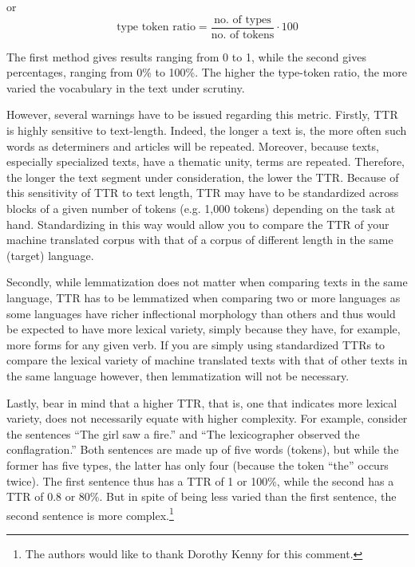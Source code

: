 \documentclass[output=paper]{langscibook}
\begin{document}
\noindent or
\begin{equation}
\text{type token ratio}=\frac{\text{no. of types}}{\text{no. of tokens}} \cdot 100
\end{equation}

The first method gives results ranging from 0 to 1, while the second gives percentages, ranging from 0\% to 100\%. The higher the type-token ratio, the more varied the vocabulary in the text under scrutiny.

However, several warnings have to be issued regarding this metric. Firstly, TTR is highly sensitive to text-length. Indeed, the longer a text is, the more often such words as determiners and articles will be repeated. Moreover, because texts, especially specialized texts, have a thematic unity, terms are repeated. Therefore, the longer the text segment under consideration, the lower the TTR. Because of this sensitivity of TTR to text length, TTR may have to be standardized across blocks of a given number of tokens (e.g. 1,000 tokens) depending on the task at hand. Standardizing in this way would allow you to compare the TTR of your machine translated corpus with that of a corpus of different length in the same (target) language.

Secondly, while lemmatization does not matter when comparing texts in the same language, TTR has to be lemmatized when comparing two or more languages as some languages have richer inflectional morphology than others and thus would be expected to have more lexical variety, simply because they have, for example, more forms for any given verb. If you are simply using standardized TTRs to compare the lexical variety of machine translated texts with that of other texts in the same language however, then lemmatization will not be necessary. 

Lastly, bear in mind that a higher TTR, that is, one that indicates more lexical variety, does not necessarily equate with higher complexity. For example, consider the sentences “The girl saw a fire.” and “The lexicographer observed the conflagration.” Both sentences are made up of five words (tokens), but while the former has five types, the latter has only four (because the token “the” occurs twice). The first sentence thus has a TTR of 1 or 100\%, while the second has a TTR of 0.8 or 80\%. But in spite of being less varied than the first sentence, the second sentence is more complex.\footnote{The authors would like to thank Dorothy Kenny for this comment.}
\end{document}

